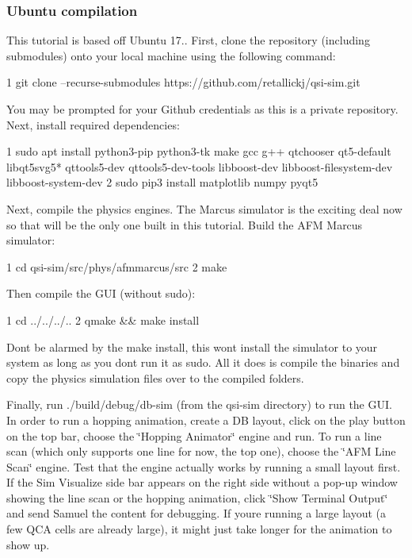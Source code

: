 \subsubsection*{Ubuntu compilation}

This tutorial is based off Ubuntu 17.. First, clone the repository (including submodules) onto your local machine using the following command\+:


\begin{DoxyCode}
1 git clone --recurse-submodules https://github.com/retallickj/qsi-sim.git
\end{DoxyCode}


You may be prompted for your Github credentials as this is a private repository. Next, install required dependencies\+:


\begin{DoxyCode}
1 sudo apt install python3-pip python3-tk make gcc g++ qtchooser qt5-default libqt5svg5* qttools5-dev
       qttools5-dev-tools libboost-dev libboost-filesystem-dev libboost-system-dev
2 sudo pip3 install matplotlib numpy pyqt5
\end{DoxyCode}


Next, compile the physics engines. The Marcus simulator is the exciting deal now so that will be the only one built in this tutorial. Build the A\+FM Marcus simulator\+:


\begin{DoxyCode}
1 cd qsi-sim/src/phys/afmmarcus/src
2 make
\end{DoxyCode}


Then compile the G\+UI (without sudo)\+:


\begin{DoxyCode}
1 cd ../../../..
2 qmake && make install
\end{DoxyCode}


Don\textquotesingle{}t be alarmed by the {\ttfamily make install}, this won\textquotesingle{}t install the simulator to your system as long as you don\textquotesingle{}t run it as sudo. All it does is compile the binaries and copy the physics simulation files over to the compiled folders.

Finally, run {\ttfamily ./build/debug/db-\/sim} (from the qsi-\/sim directory) to run the G\+UI. In order to run a hopping animation, create a DB layout, click on the play button on the top bar, choose the \char`\"{}\+Hopping Animator\char`\"{} engine and run. To run a line scan (which only supports one line for now, the top one), choose the \char`\"{}\+A\+F\+M Line Scan\char`\"{} engine. Test that the engine actually works by running a small layout first. If the Sim Visualize side bar appears on the right side without a pop-\/up window showing the line scan or the hopping animation, click \char`\"{}\+Show Terminal Output\char`\"{} and send Samuel the content for debugging. If you\textquotesingle{}re running a large layout (a few Q\+CA cells are already large), it might just take longer for the animation to show up.

